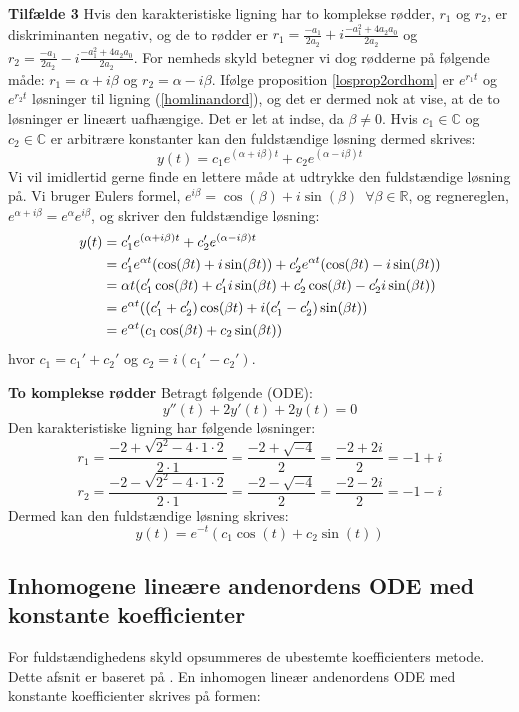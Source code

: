 \hfill \break
\textbf{Tilfælde 3}\hfill \break
Hvis den karakteristiske ligning har to komplekse rødder, $r_1$ og $r_2$, er diskriminanten negativ, og de to rødder er $r_1=\frac{-a_1}{2a_2}+i\frac{-a_1^2+4a_2a_0}{2a_2}$ og $r_2=\frac{-a_1}{2a_2}-i\frac{-a_1^2+4a_2a_0}{2a_2}$. For nemheds skyld betegner vi dog rødderne på følgende måde: $r_1=\alpha+i\beta$ og $r_2=\alpha-i\beta$. Ifølge proposition \ref{losprop2ordhom} er $e^{r_1t}$ og $e^{r_2t}$ løsninger til ligning (\ref{homlinandord}), og det er dermed nok at vise, at de to løsninger er lineært uafhængige. Det er let at indse, da $\beta \neq 0$. Hvis $c_1\in \mathbb{C}$ og $c_2 \in \mathbb{C}$ er arbitrære konstanter kan den fuldstændige løsning dermed skrives:\hfill \break
$$y(t)=c_1e^{(\alpha+i\beta)t}+c_2e^{(\alpha-i\beta)t}$$ \hfill \break
Vi vil imidlertid gerne finde en lettere måde at udtrykke den fuldstændige løsning på. Vi bruger Eulers formel\citep[s. 27]{JAB}, $e^{i\beta}=\cos(\beta)+i\sin(\beta) \enspace \forall \beta \in \mathbb{R}$, og regnereglen, $e^{\alpha+i\beta}=e^{\alpha}e^{i\beta}$, og skriver den fuldstændige løsning:\hfill \break
\begin{align}
y(t)&=c_1'e^{(\alpha+i\beta)t}+c_2'e^{(\alpha-i\beta)t} \notag \\
&=c_1'e^{\alpha t}(\cos(\beta t)+i\sin(\beta t))+c_2'e^{\alpha t}(\cos(\beta t)-i\sin(\beta t)) \notag \\
&={\alpha t}(c_1'\cos(\beta t)+c_1'i\sin(\beta t)+c_2'\cos(\beta t)-c_2'i\sin(\beta t)) \notag \\
&=e^{\alpha t}((c_1'+c_2')\cos(\beta t)+i(c_1'-c_2')\sin(\beta t)) \notag \\
&=e^{\alpha t}(c_1\cos(\beta t)+c_2\sin(\beta t)) 
\end{align}
hvor $c_1=c_1'+c_2'$ og $c_2=i(c_1'-c_2')$.\hfill \break
\begin{Example}\textbf{To komplekse rødder} \hfill \break
\textnormal{Betragt følgende (ODE):}\hfill \break
$$y''(t)+2y'(t)+2y(t)=0$$\hfill \break
\textnormal{Den karakteristiske ligning har følgende løsninger:} \hfill \break
$$r_1=\frac{-2+\sqrt{2^2-4\cdot 1\cdot 2}}{2\cdot 1}=\frac{-2+\sqrt{-4}}{2}=\frac{-2+2i}{2}=-1+i$$
$$r_2=\frac{-2-\sqrt{2^2-4\cdot 1\cdot 2}}{2\cdot 1}=\frac{-2-\sqrt{-4}}{2}=\frac{-2-2i}{2}=-1-i$$\hfill \break
\textnormal{Dermed kan den fuldstændige løsning skrives:}\hfill \break
$$y(t)=e^{-t}(c_1\cos(t)+c_2\sin(t))$$
\end{Example}

\subsection{Inhomogene lineære andenordens ODE med konstante koefficienter}\label{ila} 
For fuldstændighedens skyld opsummeres de ubestemte koefficienters metode. Dette afsnit er baseret på \citep[s. 240-246]{JAB}.\hfill \break
En inhomogen lineær andenordens ODE med konstante koefficienter skrives på formen:

